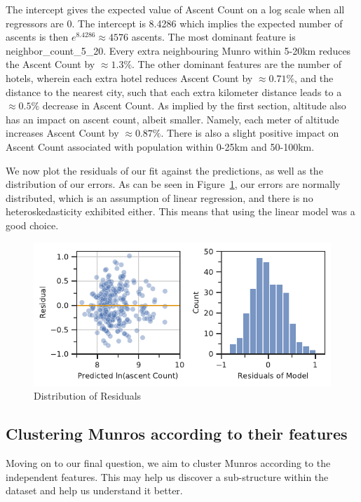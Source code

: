 \documentclass[11pt,a4paper]{article}
\begin{document}
The intercept gives the expected value of Ascent Count on a log scale when all regressors are 0. The intercept is 8.4286 which implies the expected number of ascents is then $e^{8.4286} \approx 4576$ ascents. The most dominant feature is neighbor\_count\_5\_20. Every extra neighbouring Munro within 5-20km reduces the Ascent Count by $ \approx 1.3\%$. The other dominant features are the number of hotels, wherein each extra hotel reduces Ascent Count by $\approx 0.71\%$, and the distance to the nearest city, such that each extra kilometer distance leads to a $\approx 0.5\%$ decrease in Ascent Count. As implied by the first section, altitude also has an impact on ascent count, albeit smaller. Namely, each meter of altitude increases Ascent Count by $\approx 0.87\%$. There is also a slight positive impact on Ascent Count associated with population within 0-25km and 50-100km.

We now plot the residuals of our fit against the predictions, as well as the distribution of our errors. As can be seen in Figure~\ref{fds-project-template:fig:multi_residuals_dist}, our errors are normally distributed, which is an assumption of linear regression, and there is no heteroskedasticity exhibited either. This means that using the linear model was a good choice.
\begin{figure} [h!]
  \centering
  \includegraphics{report/multi_residuals_dist.pdf}
  \caption{Distribution of Residuals}
  \label{fds-project-template:fig:multi_residuals_dist}
\end{figure}
\subsection{Clustering Munros according to their features}
Moving on to our final question, we aim to cluster Munros according to the independent features. This may help us discover a sub-structure within the dataset and help us understand it better.
\end{document}
